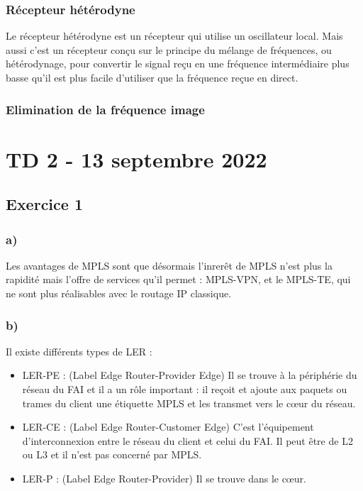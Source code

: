 \documentclass[12pt, a4paper]{article}
\begin{document}
    \subsubsection{Récepteur hétérodyne}
    Le récepteur hétérodyne est un récepteur qui utilise un oscillateur local. 
    Mais aussi c'est un récepteur conçu sur le principe du mélange de 
    fréquences, ou hétérodynage, pour convertir le signal reçu en une 
    fréquence intermédiaire plus basse qu'il est plus facile d'utiliser 
    que la fréquence reçue en direct.


    \subsubsection{Elimination de la fréquence image}


\newpage
\section{TD 2 - 13 septembre 2022}
\subsection{Exercice 1}
    \subsubsection{a)}
    Les avantages de MPLS sont que désormais l'inrerêt de MPLS n'est plus la 
    rapidité mais l'offre de services qu'il permet : MPLS-VPN, et le MPLS-TE, 
    qui ne sont plus réalisables avec le routage IP classique.\\

    \subsubsection{b)}
    Il existe différents types de LER : 
    \begin{itemize}
        \item LER-PE : (Label Edge Router-Provider Edge) Il se trouve à la 
        périphérie du réseau du FAI et il a un rôle important : il reçoit et 
        ajoute aux paquets ou trames du client une étiquette MPLS et les 
        transmet vers le cœur du réseau.\\
        \item LER-CE : (Label Edge Router-Customer Edge) C’est l’équipement 
        d’interconnexion entre le réseau du client et celui du FAI. Il peut 
        être de L2 ou L3 et il n’est pas concerné par MPLS.\\
        \item LER-P : (Label Edge Router-Provider) Il se trouve dans le cœur. 
    \end{itemize}
\end{document}
